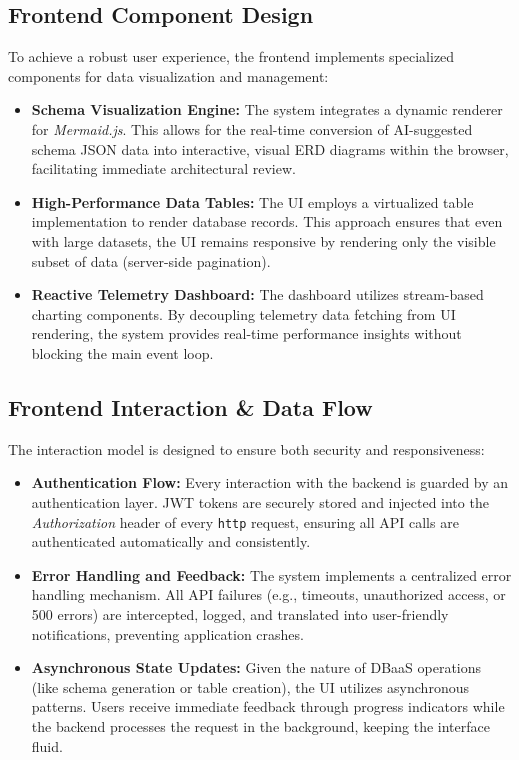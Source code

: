 \subsection{Frontend Component Design}
To achieve a robust user experience, the frontend implements specialized components for data visualization and management:
\begin{itemize}
    \item \textbf{Schema Visualization Engine:} The system integrates a dynamic renderer for \textit{Mermaid.js}. This allows for the real-time conversion of AI-suggested schema JSON data into interactive, visual ERD diagrams within the browser, facilitating immediate architectural review.
    \item \textbf{High-Performance Data Tables:} The UI employs a virtualized table implementation to render database records. This approach ensures that even with large datasets, the UI remains responsive by rendering only the visible subset of data (server-side pagination).
    \item \textbf{Reactive Telemetry Dashboard:} The dashboard utilizes stream-based charting components. By decoupling telemetry data fetching from UI rendering, the system provides real-time performance insights without blocking the main event loop.
\end{itemize}
\subsection{Frontend Interaction \& Data Flow}
The interaction model is designed to ensure both security and responsiveness:
\begin{itemize}
  \item \textbf{Authentication Flow:} Every interaction with the backend is guarded by an authentication layer. JWT tokens are securely stored and injected into the \textit{Authorization} header of every \texttt{http} request, ensuring all API calls are authenticated automatically and consistently.
    \item \textbf{Error Handling and Feedback:} The system implements a centralized error handling mechanism. All API failures (e.g., timeouts, unauthorized access, or 500 errors) are intercepted, logged, and translated into user-friendly notifications, preventing application crashes.
    \item \textbf{Asynchronous State Updates:} Given the nature of DBaaS operations (like schema generation or table creation), the UI utilizes asynchronous patterns. Users receive immediate feedback through progress indicators while the backend processes the request in the background, keeping the interface fluid.
\end{itemize}